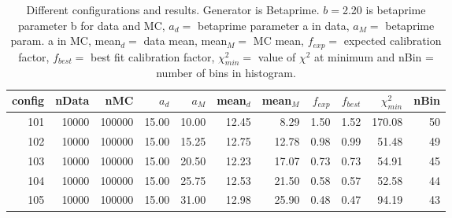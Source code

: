 \begin{table}[htp] 
\begin{center} 
\begin{tabular}{|r|rr| rr| rr| rr| rr|} 
\hline 
config& nData&   nMC& $a_d$& $a_M$&mean$_d$&mean$_M$&$f_{exp}$&$f_{best}$&$\chi^2_{min}$&  nBin \\ 
\hline 
   101& 10000&100000& 15.00& 10.00& 12.45&  8.29&  1.50&  1.52&170.08&    50 \\ 
   102& 10000&100000& 15.00& 15.25& 12.75& 12.78&  0.98&  0.99& 51.48&    49 \\ 
   103& 10000&100000& 15.00& 20.50& 12.23& 17.07&  0.73&  0.73& 54.91&    45 \\ 
   104& 10000&100000& 15.00& 25.75& 12.53& 21.50&  0.58&  0.57& 52.58&    44 \\ 
   105& 10000&100000& 15.00& 31.00& 12.98& 25.90&  0.48&  0.47& 94.19&    43 \\ 
\hline 
\end{tabular} 
\label{tab:betaprime_results} 
\caption{Different configurations and results. Generator is Betaprime. $b = $2.20 is betaprime parameter b for data and MC, $a_d = $ betaprime parameter a in data, $a_M =$ betaprime param. a in MC, mean$_d = $ data mean, mean$_M = $ MC mean,  $f_{exp}=$ expected calibration factor, $f_{best} =$ best fit calibration factor, $\chi^2_{min} = $ value of $\chi^2$ at minimum and nBin = number of bins in histogram.} 
\end{center} 
\end{table} 

